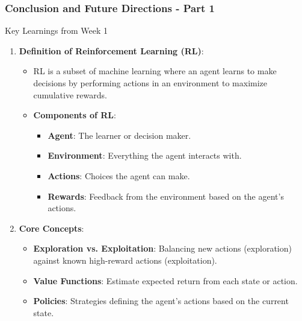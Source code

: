\documentclass[aspectratio=169]{beamer}
\begin{document}
\begin{frame}[fragile]
    \frametitle{Conclusion and Future Directions - Part 1}
    
    \begin{block}{Key Learnings from Week 1}
        \begin{enumerate}
            \item \textbf{Definition of Reinforcement Learning (RL)}:
            \begin{itemize}
                \item RL is a subset of machine learning where an agent learns to make decisions by performing actions in an environment to maximize cumulative rewards.
                \item \textbf{Components of RL}:
                    \begin{itemize}
                        \item \textbf{Agent}: The learner or decision maker.
                        \item \textbf{Environment}: Everything the agent interacts with.
                        \item \textbf{Actions}: Choices the agent can make.
                        \item \textbf{Rewards}: Feedback from the environment based on the agent's actions.
                    \end{itemize}
            \end{itemize}
            
            \item \textbf{Core Concepts}:
            \begin{itemize}
                \item \textbf{Exploration vs. Exploitation}: Balancing new actions (exploration) against known high-reward actions (exploitation).
                \item \textbf{Value Functions}: Estimate expected return from each state or action.
                \item \textbf{Policies}: Strategies defining the agent's actions based on the current state.
            \end{itemize}
        \end{enumerate}
    \end{block}
\end{frame}
\end{document}
